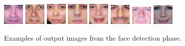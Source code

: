 \begin{figure}[H]
\includegraphics[width=0.09\textwidth]{img/fdResult1/output85.png}
\includegraphics[width=0.09\textwidth]{img/fdResult1/output91.png}
\includegraphics[width=0.09\textwidth]{img/fdResult1/output92.png}
\includegraphics[width=0.09\textwidth]{img/fdResult1/output95.png}
\includegraphics[width=0.09\textwidth]{img/fdResult1/output96.png}
\includegraphics[width=0.09\textwidth]{img/fdResult1/output97.png}
\includegraphics[width=0.09\textwidth]{img/fdResult1/output98.png}
\includegraphics[width=0.09\textwidth]{img/fdResult2/output91.png}

\caption{Examples of output images from the face detection phase.}
\label{fig:faces}
\end{figure}